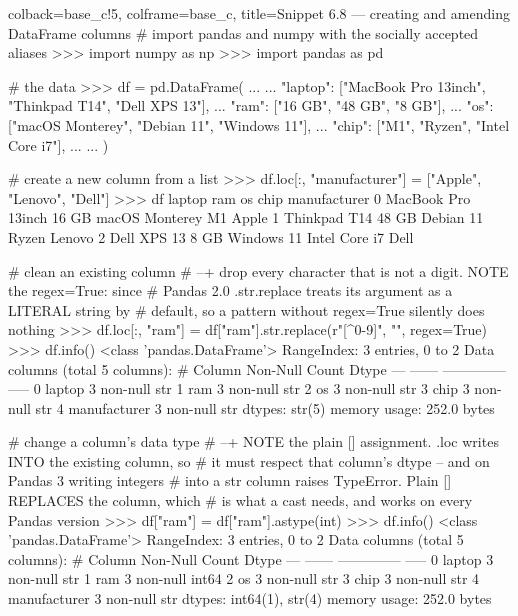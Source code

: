 \documentclass[a4paper,11pt]{book}
\begin{document}
\begin{pythoncode}[linenos=True]{colback=base_c!5, colframe=base_c, title=\sffamily Snippet 6.8 --- creating and amending DataFrame columns}
# import pandas and numpy with the socially accepted aliases
>>> import numpy as np
>>> import pandas as pd

# the data
>>> df = pd.DataFrame(
...         {
...             "laptop": ["MacBook Pro 13inch", "Thinkpad T14", "Dell XPS 13"],
...             "ram": ["16 GB", "48 GB", "8 GB"],
...             "os": ["macOS Monterey", "Debian 11", "Windows 11"],
...             "chip": ["M1", "Ryzen", "Intel Core i7"],
...         }
... )

# create a new column from a list
>>> df.loc[:, "manufacturer"] = ["Apple", "Lenovo", "Dell"]
>>> df
               laptop    ram              os           chip manufacturer
0  MacBook Pro 13inch  16 GB  macOS Monterey             M1        Apple
1        Thinkpad T14  48 GB       Debian 11          Ryzen       Lenovo
2         Dell XPS 13   8 GB      Windows 11  Intel Core i7         Dell

# clean an existing column
# --+ drop every character that is not a digit. NOTE the regex=True: since
#     Pandas 2.0 .str.replace treats its argument as a LITERAL string by
#     default, so a pattern without regex=True silently does nothing
>>> df.loc[:, "ram"] = df["ram"].str.replace(r"[^0-9]", "", regex=True)
>>> df.info()
<class 'pandas.DataFrame'>
RangeIndex: 3 entries, 0 to 2
Data columns (total 5 columns):
 #   Column        Non-Null Count  Dtype
---  ------        --------------  -----
 0   laptop        3 non-null      str  
 1   ram           3 non-null      str  
 2   os            3 non-null      str  
 3   chip          3 non-null      str  
 4   manufacturer  3 non-null      str  
dtypes: str(5)
memory usage: 252.0 bytes

# change a column's data type
# --+ NOTE the plain [] assignment. .loc writes INTO the existing column, so
#     it must respect that column's dtype -- and on Pandas 3 writing integers
#     into a str column raises TypeError. Plain [] REPLACES the column, which
#     is what a cast needs, and works on every Pandas version
>>> df["ram"] = df["ram"].astype(int)
>>> df.info()
<class 'pandas.DataFrame'>
RangeIndex: 3 entries, 0 to 2
Data columns (total 5 columns):
 #   Column        Non-Null Count  Dtype
---  ------        --------------  -----
 0   laptop        3 non-null      str  
 1   ram           3 non-null      int64
 2   os            3 non-null      str  
 3   chip          3 non-null      str  
 4   manufacturer  3 non-null      str  
dtypes: int64(1), str(4)
memory usage: 252.0 bytes


\end{pythoncode}
\end{document}
